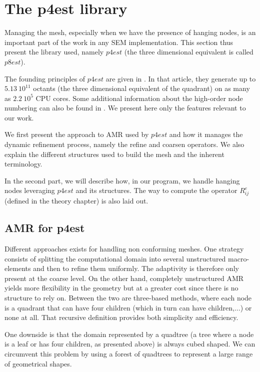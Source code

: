 \section{The p4est library}

Managing the mesh, especially when we have the presence of hanging nodes, is an important part of the work in any SEM implementation. This section thus present the library used, namely $p4est$ (the three dimensional equivalent is called $p8est$). 

The founding principles of $p4est$ are given in \cite{p4est}. In that article, they generate up to $5.13\: 10^{11}$ octants (the three dimensional equivalent of the quadrant) on as many as $2.2 \: 10^{5}$ CPU cores. Some additional information about the high-order node numbering can also be found in \cite{p4est2}. We present here only the features relevant to our work. 

We first present the approach to AMR used by $p4est$ and how it manages the dynamic refinement process, namely the refine and coarsen operators. We also explain the different structures used to build the mesh and the inherent terminology. 

In the second part, we will describe how, in our program, we handle hanging nodes leveraging $p4est$ and its structures. The way to compute the operator $R_{ij}^e$ (defined in the theory chapter) is also laid out. 

\subsection{AMR for p4est}

Different approaches exists for handling non conforming meshes. One strategy consists of splitting the computational domain into several unstructured macro-elements and then to refine them uniformly. The adaptivity is therefore only present at the coarse level. On the other hand, completely unstructured AMR yields more flexibility in the geometry but at a greater cost since there is no structure to rely on. Between the two are three-based methods, where each node is a quadrant that can have four children (which in turn can have children,...) or none at all. That recursive definition provides both simplicity and efficiency.

One downside is that the domain represented by a quadtree (a tree where a node is a leaf or has four children, as presented above) is always cubed shaped. We can circumvent this problem by using a forest of quadtrees to represent a large range of geometrical shapes. 

